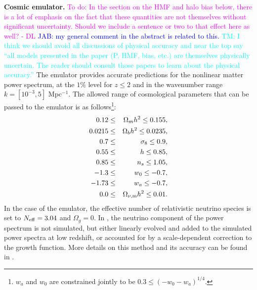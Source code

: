 \documentclass[\docopts]{\docclass}
\newcommand{\todo}[1]{\textcolor{magenta}{To do: #1}}
\newcommand{\jab}[1]{\textcolor{blue}{JAB: #1}}
\newcommand{\tom}[1]{\textcolor{cyan}{TM: #1}}
\begin{document}
{\bf Cosmic emulator.} \todo{In the section on the HMF and halo bias below, there is a lot of emphasis on the fact that these quantities are not themselves without significant uncertainty. Should we include a sentence or two to that effect here as well? - DL} \jab{my general comment in the abstract is related to this.} \tom{I think we should avoid all discussions of physical accuracy and near the top say ``all models presented in the paper (P, HMF, bias, etc.) are themselves physically uncertain. The reader should consult those papers to learn about the physical accuracy.''} The emulator \citep{Lawrence17} provides accurate predictions for the nonlinear matter power spectrum, at the $1\%$ level for $z\leq 2$ and in the wavenumber range $k=[10^{-3},5]$ Mpc$^{-1}$. The allowed range of cosmological parameters that can be passed to the emulator is as follows\footnote{$w_a$ and $w_0$ are constrained jointly to be $0.3\leq (-w_0-w_a)^{1/4}$.}:
 \begin{eqnarray}
 0.12&\leq& \Omega_{m} h^2 \leq 0.155,\nonumber\\
 0.0215&\leq& \Omega_{b} h^2 \leq 0.0235,\nonumber\\
 0.7&\leq& \sigma_8 \leq 0.9,\nonumber\\
 0.55&\leq& h \leq 0.85,\nonumber\\
 0.85&\leq& n_s\leq 1.05,\nonumber\\
 -1.3&\leq& w_0\leq-0.7,\nonumber\\
 -1.73&\leq& w_a\leq -0.7,\nonumber\\
 0.0&\leq& \Omega_{\nu, {\rm m}} h^2 \leq 0.01.
 \end{eqnarray}
In the case of the emulator, the effective number of relativistic neutrino species is set to $N_{\rm eff}=3.04$ and $\Omega_g=0$. In \citet{Lawrence17}, the neutrino component of the power spectrum is not simulated, but either linearly evolved and added to the simulated power spectra at low redshift, or accounted for by a scale-dependent correction to the growth function. More details on this method and its accuracy can be found in \citet{Upadhye14,Castorina15,Heitmann16}.
 
\end{document}
